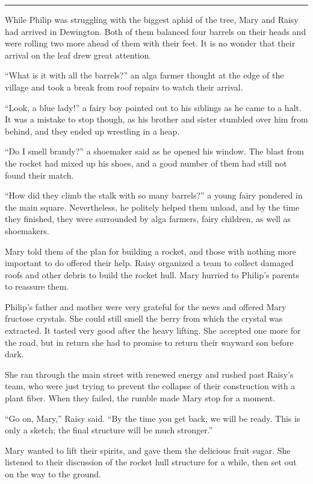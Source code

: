\documentclass[10pt, draft]{memoir}
\renewcommand{\pfbreakdisplay}{\bigskip \ding{166} \bigskip}
\newcommand{\secbreak}{\fancybreak{\pfbreakdisplay}}
\begin{document}
\secbreak

While Philip was struggling with the biggest aphid of the tree, Mary and Raisy
had arrived in Dewington. Both of them balanced four barrels on their heads
and were rolling two more ahead of them with their feet. It is no wonder that
their arrival on the leaf drew great attention.

``What is it with all the barrels?'' an alga farmer thought at the edge of the
village and took a break from roof repairs to watch their arrival.

``Look, a blue lady!'' a fairy boy pointed out to his siblings as he came to a
halt. It was a mistake to stop though, as his brother and sister stumbled over
him from behind, and they ended up wrestling in a heap.

``Do I smell brandy?'' a shoemaker said as he opened his window. The blast from
the rocket had mixed up his shoes, and a good number of them had still not
found their match.

``How did they climb the stalk with so many barrels?'' a young fairy pondered
in the main square. Nevertheless, he politely helped them unload, and by the
time they finished, they were surrounded by alga farmers, fairy children, as
well as shoemakers.

Mary told them of the plan for building a rocket, and those with nothing more
important to do offered their help. Raisy organized a team to collect damaged
roofs and other debris to build the rocket hull. Mary hurried to Philip's
parents to reassure them.

Philip's father and mother were very grateful for the news and offered Mary
fructose crystals. She could still smell the berry from which the crystal was
extracted. It tasted very good after the heavy lifting. She accepted one more
for the road, but in return she had to promise to return their wayward son
before dark.

She ran through the main street with renewed energy and rushed past Raisy's
team, who were just trying to prevent the collapse of their construction with a
plant fiber. When they failed, the rumble made Mary stop for a moment.

``Go on, Mary,'' Raisy said. ``By the time you get back, we will be ready. This
is only a sketch; the final structure will be much stronger.''

Mary wanted to lift their spirits, and gave them the delicious fruit sugar. She
listened to their discussion of the rocket hull structure for a while, then set
out on the way to the ground.
\end{document}
